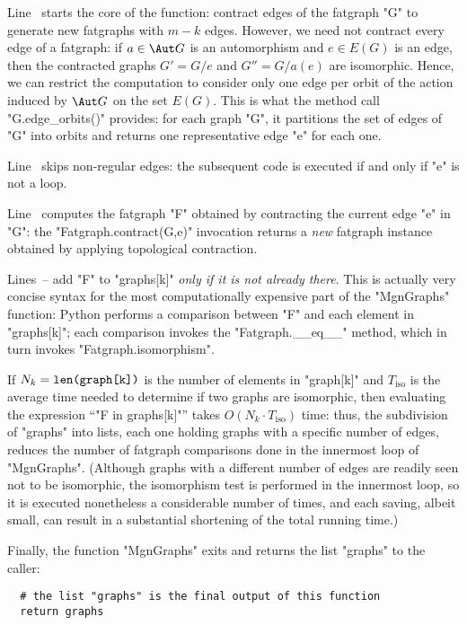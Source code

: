 Line~ starts the core of the function: contract edges
of the fatgraph "G" to generate new fatgraphs with $m-k$ edges.
However, we need not contract every edge of a fatgraph: if $a \in
\Aut G$ is an automorphism and $e \in E(G)$ is an edge, then the
contracted graphs $G' = G/e$ and $G'' = G/a(e)$ are isomorphic.
Hence, we can restrict the computation to consider only one edge per
orbit of the action induced by $\Aut G$ on the set $E(G)$. This is
what the method call "G.edge_orbits()" provides: for each graph "G",
it partitions the set of edges of "G" into orbits and returns one
representative edge "e" for each one.

Line~ skips non-regular edges: the subsequent code is
executed if and only if "e" is not a loop.

Line~ computes the fatgraph "F" obtained by
contracting the current edge "e" in "G": the "Fatgraph.contract(G,e)"
invocation returns a \emph{new} fatgraph instance obtained by applying
topological contraction.

Lines~-- add "F" to "graphs[k]"
\emph{only if it is not already there}.  This is actually very concise
syntax for the most computationally expensive part of the "MgnGraphs"
function: Python performs a comparison between "F" and each element in
"graphs[k]"; each comparison invokes the "Fatgraph.__eq__" method,
which in turn invokes "Fatgraph.isomorphism".

If $N_k = \text{{\ttfamily len(graph[k])}}$ is the number of elements in
"graph[k]" and $T_\text{iso}$ is the average time needed to
determine if two graphs are isomorphic, then evaluating the expression
``"F in graphs[k]"'' takes $O(N_k \cdot T_\text{iso})$ time: thus, the
subdivision of "graphs" into lists, each one holding graphs with a
specific number of edges, reduces the number of fatgraph comparisons
done in the innermost loop of "MgnGraphs".  (Although graphs with a
different number of edges are readily seen not to be isomorphic, the
isomorphism test is performed in the innermost loop, so it is executed
nonetheless a considerable number of times, and each saving, albeit
small, can result in a substantial shortening of the total running
time.)

Finally, the function "MgnGraphs" exits and returns the list "graphs"
to the caller:
\begin{lstlisting}
  # the list "graphs" is the final output of this function
  return graphs
\end{lstlisting}

